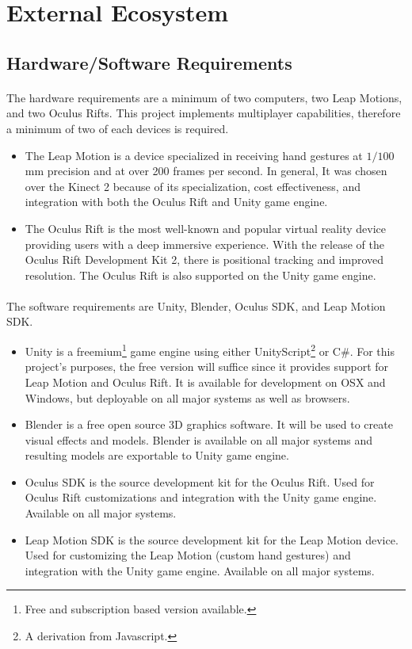 \section{External Ecosystem}

\subsection{Hardware/Software Requirements}

\paragraph{} The hardware requirements are a minimum of two computers, two Leap Motions, and two Oculus Rifts. This project implements multiplayer capabilities, therefore a minimum of two of each devices is required. 

\begin{itemize}
	\item The Leap Motion is a device specialized in receiving hand gestures at \( 1/100 \) mm precision and at over 200 frames per second. In general, It was chosen over the Kinect 2 because of its specialization, cost effectiveness, and integration with both the Oculus Rift and Unity game engine. 
	\item The Oculus Rift is the most well-known and popular virtual reality device providing users with a deep immersive experience. With the release of the Oculus Rift Development Kit 2, there is positional tracking and improved resolution. The Oculus Rift is also supported on the Unity game engine. 
\end{itemize}

\paragraph{} The software requirements are Unity, Blender, Oculus SDK, and Leap Motion SDK.

\begin{itemize}
	\item Unity is a freemium\footnote{Free and subscription based version available.} game engine using either UnityScript\footnote{A derivation from Javascript.} or C\#. For this project's purposes, the free version will suffice since it provides support for Leap Motion and Oculus Rift. It is available for development on OSX and Windows, but deployable on all major systems as well as browsers.
	\item Blender is a free open source 3D graphics software. It will be used to create visual effects and models. Blender is available on all major systems and resulting models are exportable to Unity game engine.
	\item Oculus SDK is the source development kit for the Oculus Rift. Used for Oculus Rift customizations and integration with the Unity game engine. Available on all major systems.
	\item Leap Motion SDK is the source development kit for the Leap Motion device. Used for customizing the Leap Motion (custom hand gestures) and integration with the Unity game engine. Available on all major systems.
\end{itemize}

